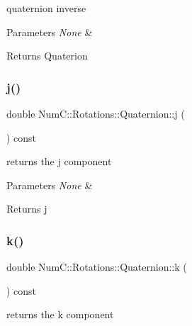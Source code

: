 quaternion inverse


\begin{DoxyParams}{Parameters}
{\em None} & \\
\hline
\end{DoxyParams}
\begin{DoxyReturn}{Returns}
Quaterion 
\end{DoxyReturn}
\mbox{\label{class_num_c_1_1_rotations_1_1_quaternion_a68559bf006214eac52a53fe3ee146175}} 
\subsubsection{\texorpdfstring{j()}{j()}}
{\footnotesize\ttfamily double Num\+C\+::\+Rotations\+::\+Quaternion\+::j (\begin{DoxyParamCaption}{ }\end{DoxyParamCaption}) const\hspace{0.3cm}{\ttfamily [inline]}}

returns the j component


\begin{DoxyParams}{Parameters}
{\em None} & \\
\hline
\end{DoxyParams}
\begin{DoxyReturn}{Returns}
j 
\end{DoxyReturn}
\mbox{\label{class_num_c_1_1_rotations_1_1_quaternion_aeabec8ebf3ee26c650a4d6384423eda9}} 
\subsubsection{\texorpdfstring{k()}{k()}}
{\footnotesize\ttfamily double Num\+C\+::\+Rotations\+::\+Quaternion\+::k (\begin{DoxyParamCaption}{ }\end{DoxyParamCaption}) const\hspace{0.3cm}{\ttfamily [inline]}}

returns the k component


